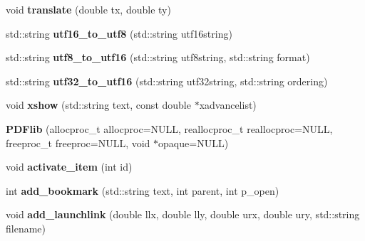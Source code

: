 \begin{DoxyCompactItemize}
\item 
\hypertarget{classPDFlib_abcecfeb7a7e76092ffe5e222dbcbea25}{void {\bfseries translate} (double tx, double ty)}\label{classPDFlib_abcecfeb7a7e76092ffe5e222dbcbea25}

\item 
\hypertarget{classPDFlib_a6e89b9ae91f51bed2a1b8c70d97f8695}{std\-::string {\bfseries utf16\-\_\-to\-\_\-utf8} (std\-::string utf16string)}\label{classPDFlib_a6e89b9ae91f51bed2a1b8c70d97f8695}

\item 
\hypertarget{classPDFlib_a2a54d9d3e07de9f742f051d5a309f3aa}{std\-::string {\bfseries utf8\-\_\-to\-\_\-utf16} (std\-::string utf8string, std\-::string format)}\label{classPDFlib_a2a54d9d3e07de9f742f051d5a309f3aa}

\item 
\hypertarget{classPDFlib_acc2113856143eca950789a3ac33cc1ec}{std\-::string {\bfseries utf32\-\_\-to\-\_\-utf16} (std\-::string utf32string, std\-::string ordering)}\label{classPDFlib_acc2113856143eca950789a3ac33cc1ec}

\item 
\hypertarget{classPDFlib_aa4dc2e0ce0aed19151b9bc7ea8824e0f}{void {\bfseries xshow} (std\-::string text, const double $\ast$xadvancelist)}\label{classPDFlib_aa4dc2e0ce0aed19151b9bc7ea8824e0f}

\item 
\hypertarget{classPDFlib_a63a60e9b1c4c18e6db742f85011510f3}{{\bfseries \-P\-D\-Flib} (allocproc\-\_\-t allocproc=\-N\-U\-L\-L, reallocproc\-\_\-t reallocproc=\-N\-U\-L\-L, freeproc\-\_\-t freeproc=\-N\-U\-L\-L, void $\ast$opaque=\-N\-U\-L\-L)}\label{classPDFlib_a63a60e9b1c4c18e6db742f85011510f3}

\item 
\hypertarget{classPDFlib_a83cf7a11d217af0e33e6dca6267965c4}{void {\bfseries activate\-\_\-item} (int id)}\label{classPDFlib_a83cf7a11d217af0e33e6dca6267965c4}

\item 
\hypertarget{classPDFlib_afbf7e219b67e0099610963c1ca9b6dca}{int {\bfseries add\-\_\-bookmark} (std\-::string text, int parent, int p\-\_\-open)}\label{classPDFlib_afbf7e219b67e0099610963c1ca9b6dca}

\item 
\hypertarget{classPDFlib_a32faa0f4597b6dceacd54a4a5497823d}{void {\bfseries add\-\_\-launchlink} (double llx, double lly, double urx, double ury, std\-::string filename)}\label{classPDFlib_a32faa0f4597b6dceacd54a4a5497823d}


\end{DoxyCompactItemize}
